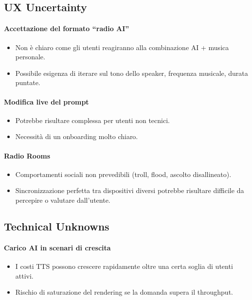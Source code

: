 \documentclass[11pt,a4paper]{article}
\begin{document}

\subsection{UX Uncertainty}

\paragraph{Accettazione del formato “radio AI”}
\begin{itemize}
    \item Non è chiaro come gli utenti reagiranno alla combinazione AI + musica personale.
    \item Possibile esigenza di iterare sul tono dello speaker, frequenza musicale, durata puntate.
\end{itemize}

\paragraph{Modifica live del prompt}
\begin{itemize}
    \item Potrebbe risultare complessa per utenti non tecnici.
    \item Necessità di un onboarding molto chiaro.
\end{itemize}

\paragraph{Radio Rooms}
\begin{itemize}
    \item Comportamenti sociali non prevedibili (troll, flood, ascolto disallineato).
    \item Sincronizzazione perfetta tra dispositivi diversi potrebbe risultare difficile da percepire o valutare dall’utente.
\end{itemize}


\subsection{Technical Unknowns}

\paragraph{Carico AI in scenari di crescita}
\begin{itemize}
    \item I costi TTS possono crescere rapidamente oltre una certa soglia di utenti attivi.
    \item Rischio di saturazione del rendering se la domanda supera il throughput.
\end{itemize}
\end{document}
